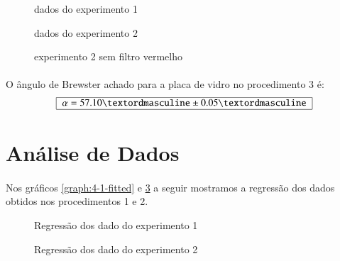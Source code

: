 \documentclass[a4paper,11pt]{article}
\begin{document}
\FloatBarrier
\begin{figure}[!t]
\vspace{-2 cm}
\begin{minipage}{\textwidth}
					\centering
					  
					\caption{dados do experimento 1}
					\label{graph:4-1}
			
\end{minipage}
\vspace{1.0 cm}
\begin{minipage}{\textwidth}
					  
					\caption{dados do experimento 2}
					\label{graph:4-2}
\end{minipage}
\end{figure}
\FloatBarrier

\FloatBarrier
\begin{figure}[!htp]

					  
					\caption{experimento 2 sem filtro vermelho}
					\label{graph:4-3}

\end{figure}
\FloatBarrier

\paragraph{} O ângulo de Brewster achado para a placa de vidro no procedimento 3 é:
	\begin{equation}		
	\centering
		\begin{tabular}{|c|}\hline 
			$\alpha = 57.10º \pm 0.05º$  \\	\hline
		\end{tabular}
	\label{eq:alpha-brewstar}	
\end{equation}

\section{Análise de Dados}
	
	\paragraph{}Nos gráficos \ref{graph:4-1-fitted} e \ref{graph:4-2-fitted} a seguir mostramos a regressão dos dados obtidos nos procedimentos 1 e 2.

\begin{figure}[!htp]
		\begin{minipage}{\textwidth}
					  
					\caption{Regressão dos dado do experimento 1}
					\label{graph:4-1-fitted}
			
		\end{minipage}			
		\vspace{4 cm}
		\begin{minipage}{\textwidth}	
					  
					\caption{Regressão dos dado do experimento 2}
					\label{graph:4-2-fitted}
		\end{minipage}	
\end{figure}			
\end{document}
